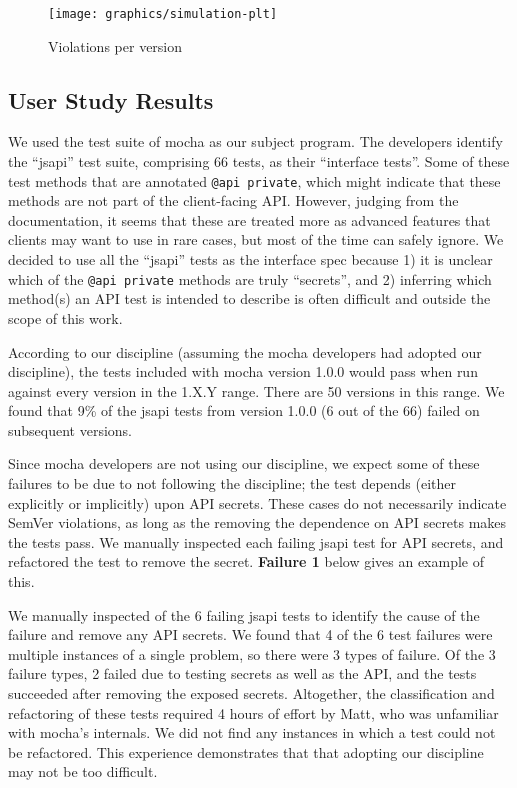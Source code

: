 \begin{figure*}
\centering
\texttt{[image: graphics/simulation-plt]}
\caption{Violations per version}
\label{fig:cumulative}
\end{figure*}

\subsection{User Study Results}
We used the test suite of mocha as our subject program. The developers
identify the ``jsapi'' test suite, comprising 66 tests, as their
``interface tests''. Some of these test methods that are annotated
{\tt @api private}, which might indicate that these methods are not
part of the client-facing API\@. However, judging from the
documentation, it seems that these are treated more as advanced
features that clients may want to use in rare cases, but most of the
time can safely ignore. We decided to use all the ``jsapi'' tests as the
interface spec because 1) it is unclear which of the {\tt @api
  private} methods are truly ``secrets'', and 2) inferring which
method(s) an API test is intended to describe is often difficult and
outside the scope of this work.

According to our discipline (assuming the mocha developers had adopted
our discipline), the tests included with mocha version 1.0.0 would
pass when run against every version in the 1.X.Y range. There are 50
versions in this range. We found that 9\% of the jsapi tests from
version 1.0.0 (6 out of the 66) failed on subsequent versions.

Since mocha developers are not using our discipline, we expect some of
these failures to be due to not following the discipline; the test
depends (either explicitly or implicitly) upon API secrets. These
cases do not necessarily indicate SemVer violations, as long as the
removing the dependence on API secrets makes the tests pass. We
manually inspected each failing jsapi test for API secrets, and
refactored the test to remove the secret. {\bf Failure 1} below gives
an example of this.

We manually inspected of the 6 failing jsapi tests to identify the
cause of the failure and remove any API secrets. We found that 4 of
the 6 test failures were multiple instances of a single problem, so
there were 3 types of failure. Of the 3 failure types, 2 failed due to
testing secrets as well as the API, and the tests succeeded after
removing the exposed secrets. Altogether, the classification and
refactoring of these tests required 4 hours of effort by Matt, who was
unfamiliar with mocha's internals. We did not find any instances in
which a test could not be refactored. This experience demonstrates
that that adopting our discipline may not be too difficult.

